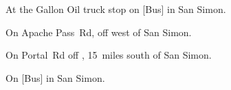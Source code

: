 
\begin{LocationList}

At the Gallon Oil truck stop on [Bus] in San Simon.

On Apache Pass~Rd, off   west of San Simon.

On Portal~Rd off  , 15~miles south of San Simon.

On [Bus] in San Simon.

\end{LocationList}
